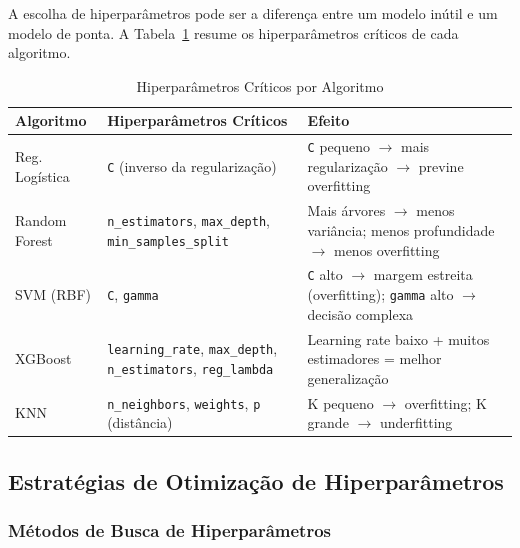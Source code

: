 A escolha de hiperparâmetros pode ser a diferença entre um modelo inútil e um modelo de ponta. A Tabela~\ref{tab:hiperparams} resume os hiperparâmetros críticos de cada algoritmo.

\begin{table}[H]
  \centering
  \caption{Hiperparâmetros Críticos por Algoritmo}
  \label{tab:hiperparams}
  \begin{tabularx}{\textwidth}{lXX}
    \toprule
    \textbf{Algoritmo} & \textbf{Hiperparâmetros Críticos} & \textbf{Efeito} \\
    \midrule
    Reg. Logística & \texttt{C} (inverso da regularização) & \texttt{C} pequeno $\rightarrow$ mais regularização $\rightarrow$ previne overfitting \\
    Random Forest & \texttt{n\_estimators}, \texttt{max\_depth}, \texttt{min\_samples\_split} & Mais árvores $\rightarrow$ menos variância; menos profundidade $\rightarrow$ menos overfitting \\
    SVM (RBF) & \texttt{C}, \texttt{gamma} & \texttt{C} alto $\rightarrow$ margem estreita (overfitting); \texttt{gamma} alto $\rightarrow$ decisão complexa \\
    XGBoost & \texttt{learning\_rate}, \texttt{max\_depth}, \texttt{n\_estimators}, \texttt{reg\_lambda} & Learning rate baixo + muitos estimadores = melhor generalização \\
    KNN & \texttt{n\_neighbors}, \texttt{weights}, \texttt{p} (distância) & K pequeno $\rightarrow$ overfitting; K grande $\rightarrow$ underfitting \\
    \bottomrule
  \end{tabularx}
\end{table}

\subsection{Estratégias de Otimização de Hiperparâmetros}

\subsubsection{Métodos de Busca de Hiperparâmetros}

